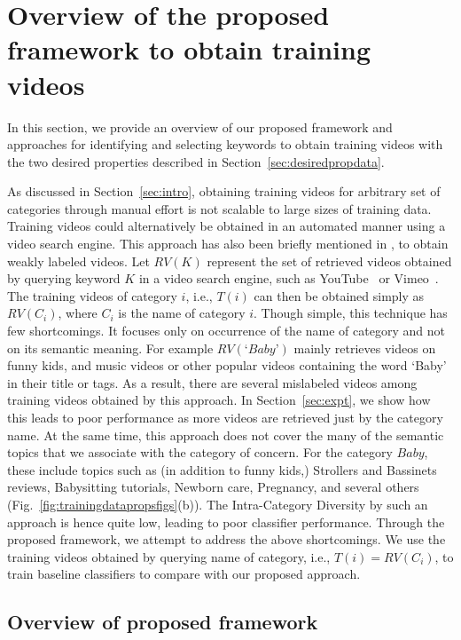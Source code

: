 \section{Overview of the proposed framework to obtain training videos}
\label{sec:overview}

In this section, we provide an overview of our proposed framework and approaches for identifying and selecting keywords to obtain training videos with the two desired properties described in Section~\ref{sec:desiredpropdata}. 

\indent   As discussed in Section~\ref{sec:intro}, obtaining training videos for arbitrary set of categories through manual effort is not scalable to large sizes of training data. Training videos could alternatively be obtained in an automated manner using a video search engine. This approach has also been briefly mentioned in \cite{wang2010youtubecat}, to obtain weakly labeled videos. Let $RV(K)$ represent the set of retrieved videos obtained by querying keyword $K$ in a video search engine, such as YouTube~\cite{Youtube} or Vimeo~\cite{Vimeo}. The training videos of category $i$, i.e., $T(i)$ can then be obtained simply as $RV(C_i)$, where $C_i$ is the name of category $i$. Though simple, this technique has few shortcomings. It focuses only on occurrence of the name of category and not on its semantic meaning. For example $RV(\text{`}Baby\text{'})$ mainly retrieves videos on funny kids, and music videos or other popular videos containing the word `Baby' in their title or tags. As a result, there are several mislabeled videos among training videos obtained by this approach. In Section~\ref{sec:expt}, we show how this leads to poor performance as more videos are retrieved just by the category name. At the same time, this approach does not cover the many of the semantic topics that we associate with the category of concern. For the category $Baby$, these include topics such as (in addition to funny kids,) Strollers and Bassinets reviews, Babysitting tutorials, Newborn care, Pregnancy, and several others (Fig.~\ref{fig:trainingdatapropsfigs}(b)). The Intra-Category Diversity by such an approach is hence quite low, leading to poor classifier performance. Through the proposed framework, we attempt to address the above shortcomings. We use the training videos obtained by querying name of category, i.e., $T(i)=RV(C_i)$, to train baseline classifiers to compare with our proposed approach. 

\subsection{Overview of proposed framework}
\label{sec:overviewframework}

